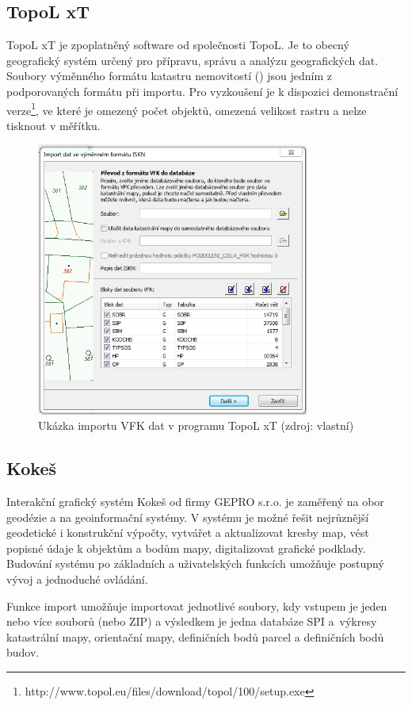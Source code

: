 \subsection{TopoL xT}
TopoL xT je zpoplatněný software od společnosti TopoL. Je to obecný
geografický systém určený pro přípravu, správu a analýzu geografických
dat. Soubory výměnného formátu katastru nemovitostí () jsou
jedním z podporovaných formátu při importu. Pro vyzkoušení je k
dispozici demonstrační
verze\footnote{http://www.topol.eu/files/download/topol/100/setup.exe},
ve které je omezený počet objektů, omezená velikost rastru a nelze
tisknout v měřítku.\citep{topol}

\begin{figure}[H]
	 \centering
      \includegraphics[height=9cm]{./pictures/topol.png}
      \caption{Ukázka importu VFK dat v programu TopoL xT (zdroj: vlastní)}
      \label{fig:topol}
  \end{figure}
\subsection{Kokeš}
Interakční grafický systém Kokeš od firmy GEPRO s.r.o. je zaměřený na
obor geodézie a na geoinformační systémy. V systému je možné řešit
nejrůznější geodetické i konstrukční výpočty, vytvářet a aktualizovat
kresby map, vést popisné údaje k objektům a bodům mapy, digitalizovat
grafické podklady. Budování systému po základních a uživatelských
funkcích umožňuje postupný vývoj a jednoduché
ovládání. \cite{kokes_cvut}

Funkce import  umožňuje importovat jednotlivé soubory, kdy vstupem je jeden nebo více souborů  (nebo ZIP) a výsledkem je jedna databáze SPI a~výkresy katastrální mapy, orientační mapy, definičních bodů parcel a definičních bodů budov. %

